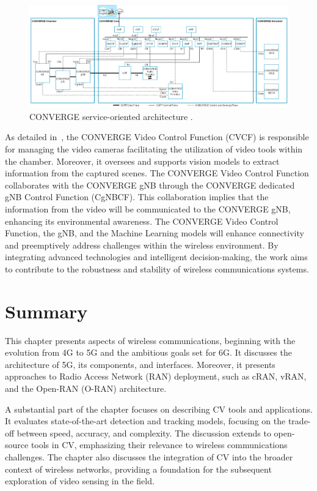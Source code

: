 \begin{figure}[H]
    \centering
    \includegraphics[width=1\linewidth]{figures/arch_converge}
    \caption[CONVERGE service-oriented architecture] {CONVERGE service-oriented architecture \cite{converge2023_specs}.}
    \label{fig:converge_arch}
\end{figure}

As detailed in~\cite{converge2023_specs}, the CONVERGE Video Control Function (CVCF) is responsible for managing the video cameras facilitating the utilization
of video tools within the chamber.
Moreover, it oversees and supports
vision models to extract information from the captured scenes.
The CONVERGE Video Control Function collaborates with the CONVERGE gNB through the CONVERGE dedicated gNB Control Function (CgNBCF).
This collaboration implies that the information from the video will be communicated to the CONVERGE gNB, enhancing its environmental awareness.
The CONVERGE Video Control Function, the gNB, and the Machine Learning models will
enhance connectivity and preemptively address challenges within the wireless environment.
By integrating advanced technologies and intelligent decision-making, the work
aims to contribute to the robustness and stability of wireless communications systems.


\section{Summary}\label{sec:Summary_SOA}
This chapter presents aspects of wireless communications, beginning with the evolution from 4G to 5G and the ambitious goals set for 6G.
It discusses the architecture of 5G, its components, and interfaces.
Moreover, it presents approaches to Radio Access Network (RAN) deployment, such as cRAN, vRAN, and the Open-RAN (O-RAN) architecture.

A substantial part of the chapter focuses on describing CV tools and applications.
It evaluates state-of-the-art detection and tracking models, focusing on the trade-off between speed, accuracy, and complexity.
The discussion extends to open-source tools in CV, emphasizing their relevance to wireless communications challenges.
The chapter also discusses the integration of CV into the broader context of wireless networks, providing a foundation for the subsequent exploration of video sensing in the field.

